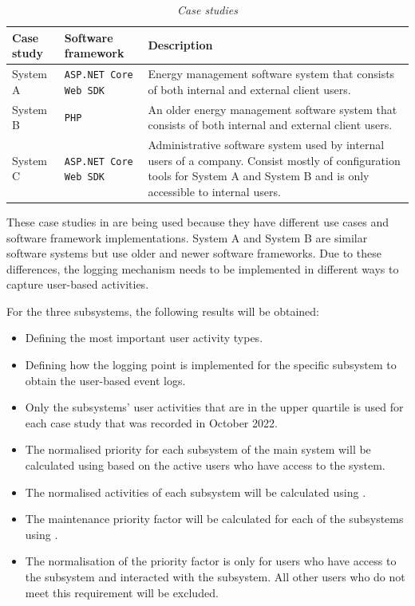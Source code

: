 \begin{table}[!htb]
	\centering
	\caption[Case studies]
	{\textit{Case studies}}
	\label{tbl:ch3_caseStudies}
	\begin{tabularx}{\textwidth}{llX}
		\toprule
		\textbf{Case study} & \textbf{Software framework} & \textbf{Description} \\
		\midrule
		\rowcolor{lightgray}
		System A & \texttt{ASP.NET Core Web SDK} & \RaggedRight Energy management software system that consists of both internal and external client users. \\
		System B & \texttt{PHP} & \RaggedRight An older energy management software system that consists of both internal and external client users. \\
		\rowcolor{lightgray}
		System C & \texttt{ASP.NET Core Web SDK} & \RaggedRight Administrative software system used by internal users of a company. Consist mostly of configuration tools for System A and System B and is only accessible to internal users. \\
		\bottomrule
	\end{tabularx}
\end{table}

These case studies in  are being used because they have different use cases and software framework implementations. System A and System B are similar software systems but use older and newer software frameworks. Due to these differences, the logging mechanism needs to be implemented in different ways to capture user-based activities.\par For the three subsystems, the following results will be obtained:

\begin{itemize}
\item Defining the most important user activity types.
\item Defining how the logging point is implemented for the specific subsystem to obtain the user-based event logs.
\item Only the subsystems' user activities that are in the upper quartile is used for each case study that was recorded in October 2022.
\item The normalised priority for each subsystem of the main system will be calculated using  based on the active users who have access to the system.
\item The normalised activities of each subsystem will be calculated using .
\item The maintenance priority factor will be calculated for each of the subsystems using .
\item The normalisation of the priority factor is only for users who have access to the subsystem and interacted with the subsystem. All other users who do not meet this requirement will be excluded.
\end{itemize}

